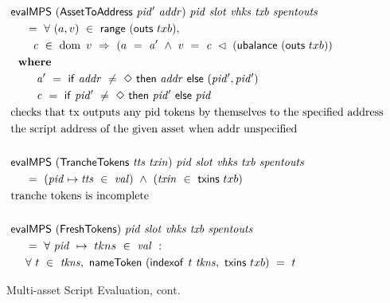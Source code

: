 \begin{figure*}[htb]
  \begin{align*}
    & \mathsf{evalMPS}
     ~(\mathsf{AssetToAddress}~\mathit{pid'}~\mathit{addr})~\mathit{pid}~ \mathit{slot}~\mathit{vhks} ~\mathit{txb}~\mathit{spentouts} \\
    &~~~~ =~ \forall~(a, v)~\in~\mathsf{range}~(\mathsf{outs}~txb),~\\
    &~~~~~~ \mathit{c}~\in~\operatorname{dom}~v~\Rightarrow~(a~=~ \mathit{a'} ~\wedge~
                       v~=~\mathit{c}~ \lhd~(\mathsf{ubalance}~(\mathsf{outs}~txb)) \\
    & ~ ~ \mathbf{where}~ ~  \\
    & ~~~~~~~ \mathit{a'}~=~\mathsf{if}~ \mathit{addr}~\neq~\Diamond~\mathsf{then}~\mathit{addr}~\mathsf{else}~\mathit{(pid',pid')} \\
    & ~~~~~~~ \mathit{c}~=~\mathsf{if}~ \mathit{pid'}~\neq~\Diamond~\mathsf{then}~\mathit{pid'}~\mathsf{else}~\mathit{pid} \\
    & \text{checks that tx outputs any pid tokens by themselves to the specified address} \\
    & \text {the script address of the given asset when addr unspecified} \\~\\
    & \mathsf{evalMPS}
     ~(\mathsf{TrancheTokens}~\mathit{tts}~\mathit{txin})~\mathit{pid}~\mathit{slot}~\mathit{vhks}
     ~\mathit{txb}~\mathit{spentouts}  \\
    &~~~~ =~(\mathit{pid}\mapsto\mathit{tts}~\in~\mathit{val})~ \wedge~(\mathit{txin}~\in~\mathsf{txins}~{txb}) \\
    & \text{tranche tokens is incomplete} \\~\\
    & \mathsf{evalMPS}
     ~(\mathsf{FreshTokens})~\mathit{pid}~\mathit{slot}~\mathit{vhks}
     ~\mathit{txb}~\mathit{spentouts}
      \\
    &~~~~ =~\forall~\mathit{pid}~ \mapsto ~tkns ~\in~ \mathit{val}~:~ \\
    &~~~~ \forall~t~\in~\mathit{tkns},~
        \mathsf{nameToken}~(\mathsf{indexof}~\mathit{t}~\mathit{tkns},~\mathsf{txins}~{txb})~=~t
    \end{align*}
    \caption{Multi-asset Script Evaluation, cont.}
    \label{fig:defs:tx-mc-eval-2}
\end{figure*}

